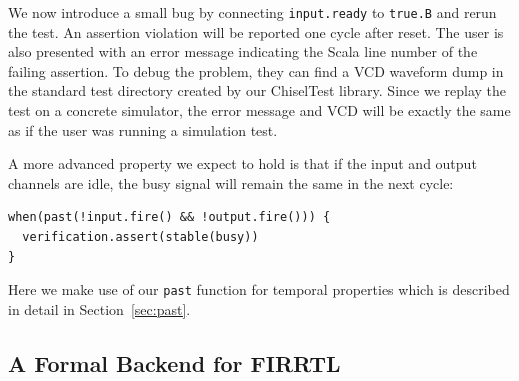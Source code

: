 \documentclass[conference]{IEEEtran}
\newcommand{\code}[1]{{\small{\texttt{#1}}}}
\begin{document}
We now introduce a small bug by connecting \code{input.ready} to \code{true.B} and rerun the test.
An assertion violation will be reported one cycle after reset.
The user is also presented with an error message indicating the Scala line number of the failing assertion.
To debug the problem, they can find a VCD waveform dump in the standard test directory created by our
ChiselTest library.
Since we replay the test on a concrete simulator, the error message and VCD will be exactly the same
as if the user was running a simulation test.

A more advanced property we expect to hold is that if the input and output channels are idle, the busy
signal will remain the same in the next cycle:
\begin{verbatim}
when(past(!input.fire() && !output.fire())) {
  verification.assert(stable(busy))
}
\end{verbatim}
Here we make use of our \code{past} function for temporal properties which is described in detail in Section~\ref{sec:past}.



\subsection{A Formal Backend for FIRRTL}\label{sec:undef}
\end{document}
